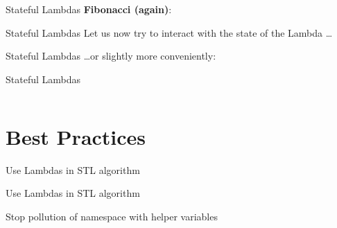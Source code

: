 \begin{frame}[fragile]{Stateful Lambdas}
    \textbf{Fibonacci (again)}:
\end{frame}

\begin{frame}[fragile]{Stateful Lambdas}
    Let us now try to interact with the state of the Lambda \ldots
\end{frame}

\begin{frame}[fragile]{Stateful Lambdas}
    \ldots or slightly more conveniently:
\end{frame}

\begin{frame}[fragile]{Stateful Lambdas}
    \begin{columns}[t]
        \begin{column}{.6\textwidth}
        \end{column}
        \begin{column}{.35\textwidth}
        \end{column}
    \end{columns}
\end{frame}

\begin{frame}
    \centering
    \scalebox{3}{Best Practices}

\end{frame}

\section{Best Practices}

\begin{frame}[fragile]{Use Lambdas in STL algorithm}
\end{frame}

\begin{frame}[fragile]{Use Lambdas in STL algorithm}
\end{frame}

\begin{frame}[fragile]{Stop pollution of namespace with helper variables}
\end{frame}

